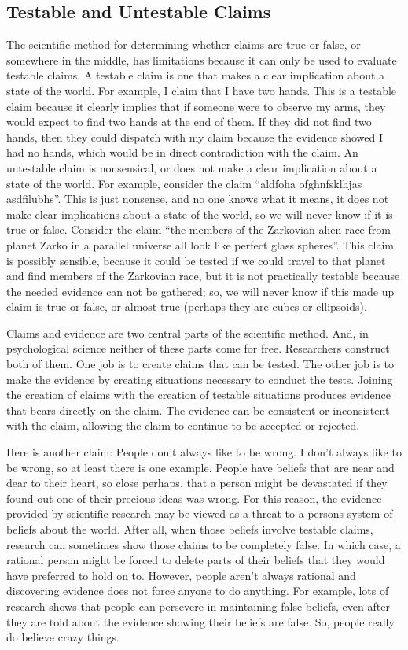 \subsection{Testable and Untestable Claims}
The scientific method for determining whether claims are true or false, or somewhere in the middle, has limitations because it can only be used to evaluate testable claims. A testable claim is one that makes a clear implication about a state of the world. For example, I claim that I have two hands. This is a testable claim because it clearly implies that if someone were to observe my arms, they would expect to find two hands at the end of them. If they did not find two hands, then they could dispatch with my claim because the evidence showed I had no hands, which would be in direct contradiction with the claim. An untestable claim is nonsensical, or does not make a clear implication about a state of the world. For example, consider the claim “aldfoha ofghnfsklhjas asdfilubhs”. This is just nonsense, and no one knows what it means, it does not make clear implications about a state of the world, so we will never know if it is true or false. Consider the claim “the members of the Zarkovian alien race from planet Zarko in a parallel universe all look like perfect glass spheres”. This claim is possibly sensible, because it could be tested if we could travel to that planet and find members of the Zarkovian race, but it is not practically testable because the needed evidence can not be gathered; so, we will never know if this made up claim is true or false, or almost true (perhaps they are cubes or ellipsoids).

Claims and evidence are two central parts of the scientific method. And, in psychological science neither of these parts come for free. Researchers construct both of them. One job is to create claims that can be tested. The other job is to make the evidence by creating situations necessary to conduct the tests. Joining the creation of claims with the creation of testable situations produces evidence that bears directly on the claim. The evidence can be consistent or inconsistent with the claim, allowing the claim to continue to be accepted or rejected.

Here is another claim: People don't always like to be wrong. I don't always like to be wrong, so at least there is one example. People have beliefs that are near and dear to their heart, so close perhaps, that a person might be devastated if they found out one of their precious ideas was wrong. For this reason, the evidence provided by scientific research may be viewed as a threat to a persons system of beliefs about the world. After all, when those beliefs involve testable claims, research can sometimes show those claims to be completely false. In which case, a rational person might be forced to delete parts of their beliefs that they would have preferred to hold on to. However, people aren't always rational and discovering evidence does not force anyone to do anything. For example, lots of research shows that people can persevere in maintaining false beliefs, even after they are told about the evidence showing their beliefs are false. So, people really do believe crazy things.

